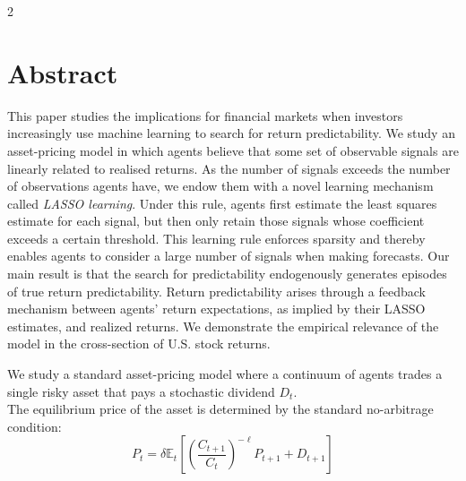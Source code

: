 \documentclass[a0,portrait]{a0poster}
\begin{document}
\begin{multicols*}{2}


\color{UoCBlue}
\section*{Abstract}
\color{Black}

This paper studies the implications for financial markets when investors increasingly use machine learning to search for return predictability.
We study an asset-pricing model in which agents believe that some set of observable signals are linearly related to realised returns.
As the number of signals exceeds the number of observations agents have, we endow them with a novel learning mechanism called \textit{LASSO learning}.
Under this rule, agents first estimate the least squares estimate for each signal, but then only retain those signals whose coefficient exceeds a certain threshold.
This learning rule enforces sparsity and thereby enables agents to consider a large number of signals when making forecasts.
Our main result is that the search for predictability endogenously generates episodes of true return predictability.
Return predictability arises through a feedback mechanism between agents' return expectations, as implied by their LASSO estimates, and realized returns.
We demonstrate the empirical relevance of the model in the cross-section of U.S. stock returns.


\vspace{0.5cm}




\begin{tcolorbox}[colback=white, colframe=UoCBlue, title=Environment and Benchmark, toptitle=10pt, bottomtitle=10pt, fonttitle=\bfseries]

\vspace{0.5cm}
We study a standard \textcite{lucas1978} asset-pricing model where a continuum of agents trades a single risky asset that pays a stochastic dividend $D_t$.  \\
The equilibrium price of the asset is determined by the standard no-arbitrage condition:
\begin{equation}\label{eq:equilibrium_price}
    P_t = \delta \mathbb{E}_t \left[ \left(\frac{C_{t+1}}{C_t}\right)^{- \ell} P_{t+1} + D_{t+1} \right]
\end{equation}


\end{tcolorbox}
\end{multicols*}
\end{document}
